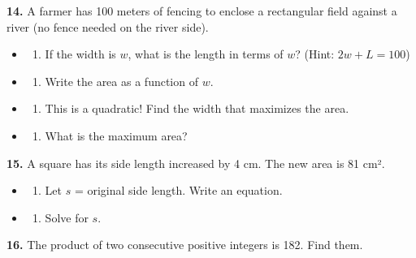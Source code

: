 \documentclass[
  11pt,
]{article}
\providecommand{\tightlist}{%
  \setlength{\itemsep}{0pt}\setlength{\parskip}{0pt}}
\begin{document}
\textbf{14.} A farmer has 100 meters of fencing to enclose a rectangular
field against a river (no fence needed on the river side).

\begin{itemize}
\item
  \begin{enumerate}
  \def\labelenumi{(\alph{enumi})}
  \tightlist
  \item
    If the width is \(w\), what is the length in terms of \(w\)? (Hint:
    \(2w + L = 100\))
  \end{enumerate}
\item
  \begin{enumerate}
  \def\labelenumi{(\alph{enumi})}
  \setcounter{enumi}{1}
  \tightlist
  \item
    Write the area as a function of \(w\).
  \end{enumerate}
\item
  \begin{enumerate}
  \def\labelenumi{(\alph{enumi})}
  \setcounter{enumi}{2}
  \tightlist
  \item
    This is a quadratic! Find the width that maximizes the area.
  \end{enumerate}
\item
  \begin{enumerate}
  \def\labelenumi{(\alph{enumi})}
  \setcounter{enumi}{3}
  \tightlist
  \item
    What is the maximum area?
  \end{enumerate}
\end{itemize}

\textbf{15.} A square has its side length increased by 4 cm. The new
area is 81 cm².

\begin{itemize}
\item
  \begin{enumerate}
  \def\labelenumi{(\alph{enumi})}
  \tightlist
  \item
    Let \(s\) = original side length. Write an equation.
  \end{enumerate}
\item
  \begin{enumerate}
  \def\labelenumi{(\alph{enumi})}
  \setcounter{enumi}{1}
  \tightlist
  \item
    Solve for \(s\).
  \end{enumerate}
\end{itemize}

\textbf{16.} The product of two consecutive positive integers is 182.
Find them.
\end{document}
